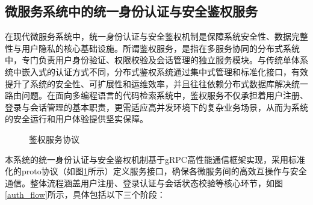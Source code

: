 \documentclass[UTF8,a4paper,12pt]{ctexart}
\numberwithin{equation}{section}
\begin{document}
\subsection{微服务系统中的统一身份认证与安全鉴权服务}
在现代微服务系统中，统一身份认证与安全鉴权机制是保障系统安全性、数据完整性与用户隐私的核心基础设施。所谓鉴权服务，是指在多服务协同的分布式系统中，专门负责用户身份验证、权限校验及会话管理的独立服务模块。与传统单体系统中嵌入式的认证方式不同，分布式鉴权系统通过集中式管理和标准化接口，有效提升了系统的安全性、可扩展性和运维效率，并且往往依赖分布式数据库解决统一路由问题。在面向多编程语言的代码检索系统中，鉴权服务不仅承担着用户注册、登录与会话管理的基本职责，更需适应高并发环境下的复杂业务场景，从而为系统的安全运行和用户体验提供坚实保障。
\begin{figure}[H]
	\caption{鉴权服务协议}
	\label{auth}
\end{figure}
本系统的统一身份认证与安全鉴权机制基于gRPC高性能通信框架实现，采用标准化的proto协议（如图\ref{auth}所示）定义服务接口，确保各微服务间的高效互操作与安全通信。整体流程涵盖用户注册、登录认证与会话状态校验等核心环节，如图\ref{auth_flow}所示，具体包括以下三个阶段：\par
\end{document}
